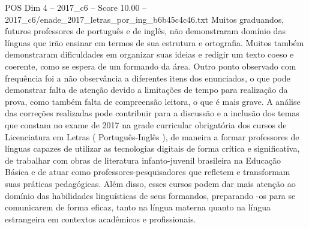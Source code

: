 \begin{textsample}{POS Dim 4 – 2017\_c6 – Score 10.00 – 2017\_c6/enade\_2017\_letras\_por\_ing\_b6b45c4c46.txt}
Muitos graduandos, futuros professores de português e de inglês, não demonstraram domínio das línguas que irão ensinar em termos de sua estrutura e ortografia.
Muitos também demonstraram dificuldades em organizar suas ideias e redigir um texto coeso e coerente, como se espera de um formando da área.
Outro ponto observado com frequência foi a não observância a diferentes itens dos enunciados, o que pode demonstrar falta de atenção devido a limitações de tempo para realização da prova, como também falta de compreensão leitora, o que é mais grave.
A análise das correções realizadas pode contribuir para a discussão e a inclusão dos temas que constam no exame de 2017 na grade curricular obrigatória dos cursos de Licenciatura em Letras ( Português-Inglês ), de maneira a formar professores de línguas capazes de utilizar as tecnologias digitais de forma crítica e significativa, de trabalhar com obras de literatura infanto-juvenil brasileira na Educação Básica e de atuar como professores-pesquisadores que refletem e transformam suas práticas pedagógicas.
Além disso, esses cursos podem dar mais atenção ao domínio das habilidades linguísticas de seus formandos, preparando -os para se comunicarem de forma eficaz, tanto na língua materna quanto na língua estrangeira em contextos acadêmicos e profissionais.

\end{textsample}
